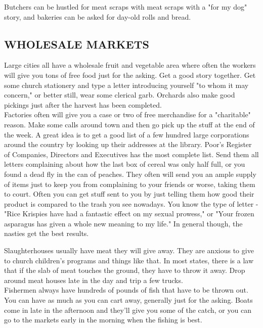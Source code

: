 \documentclass[11pt,twoside,a4paper]{book}
\begin{document}
Butchers can be hustled for meat scraps with meat scraps with a "for my dog" story, and bakeries can be asked for day-old rolls and bread.

\subsection{WHOLESALE MARKETS}

Large cities all have a wholesale fruit and vegetable area where often the workers will give you tons of free food just for the asking. Get a good story together. Get some church stationery and type a letter introducing yourself "to whom it may concern," or better still, wear some clerical garb. Orchards also make good pickings just after the harvest has been completed.~\\

Factories often will give you a case or two of free merchandise for a "charitable" reason. Make some calls around town and then go pick up the stuff at the end of the week. A great idea is to get a good list of a few hundred large corporations around the country by looking up their addresses at the library. Poor's Register of Companies, Directors and Executives has the most complete list. Send them all letters complaining about how the last box of cereal was only half full, or you found a dead fly in the can of peaches. They often will send you an ample supply of items just to keep you from complaining to your friends or worse, taking them to court. Often you can get stuff sent to you by just telling them how good their product is compared to the trash you see nowadays. You know the type of letter - "Rice Krispies have had a fantastic effect on my sexual prowess," or "Your frozen asparagus has given a whole new meaning to my life." In general though, the nasties get the best results.~\\

\clearpage %

Slaughterhouses usually have meat they will give away. They are anxious to give to church children's programs and things like that. In most states, there is a law that if the slab of meat touches the ground, they have to throw it away. Drop around meat houses late in the day and trip a few trucks.~\\

Fishermen always have hundreds of pounds of fish that have to be thrown out. You can have as much as you can cart away, generally just for the asking. Boats come in late in the afternoon and they'll give you some of the catch, or you can go to the markets early in the morning when the fishing is best.~\\
\end{document}
